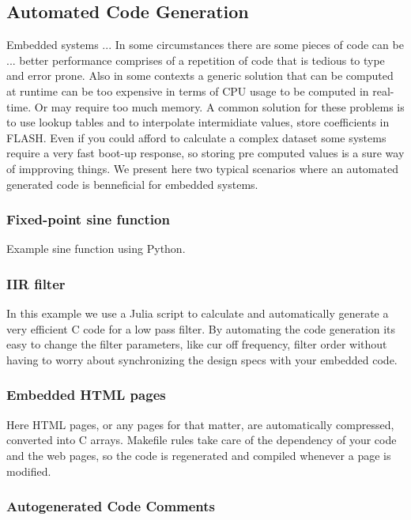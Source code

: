 \subsection{Automated Code Generation}

Embedded systems ...
In some circumstances there are some pieces of code can be ...
better performance comprises of a repetition of code that is tedious to type and error prone. Also in some contexts a generic solution that can be computed at runtime can be too expensive in terms of CPU usage to be computed in real-time. Or may require too much memory. A common solution for these problems is to use lookup tables and to interpolate intermidiate values, store coefficients in FLASH.
Even if you could afford to calculate a complex dataset some systems require a very fast boot-up response, so storing pre computed values is a sure way of impproving things.
We present here two typical scenarios where an automated generated code is benneficial for embedded systems.

\subsubsection{Fixed-point sine function}

Example sine function using Python.


\subsubsection{IIR filter}

In this example we use a Julia script to calculate and automatically generate a very efficient C code for a low pass filter. By automating the code generation its easy to change the filter parameters, like cur off frequency, filter order without having to worry about synchronizing the design specs with your embedded code.

\subsubsection{Embedded HTML pages}

Here HTML pages, or any pages for that matter, are automatically compressed, converted into C arrays. Makefile rules take care of the dependency of your code and the web pages, so the code is regenerated and compiled whenever a page is modified.


\subsubsection{Autogenerated Code Comments}


